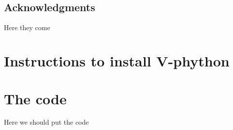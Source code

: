 \documentclass[12pt]{iopart}
\begin{document}
%

\subsection{Acknowledgments}
Here they come

\appendix
\section{Instructions to install V-phython}
\label{appendix:python}

\section{The code}
Here we should put the code
 



\end{document}
